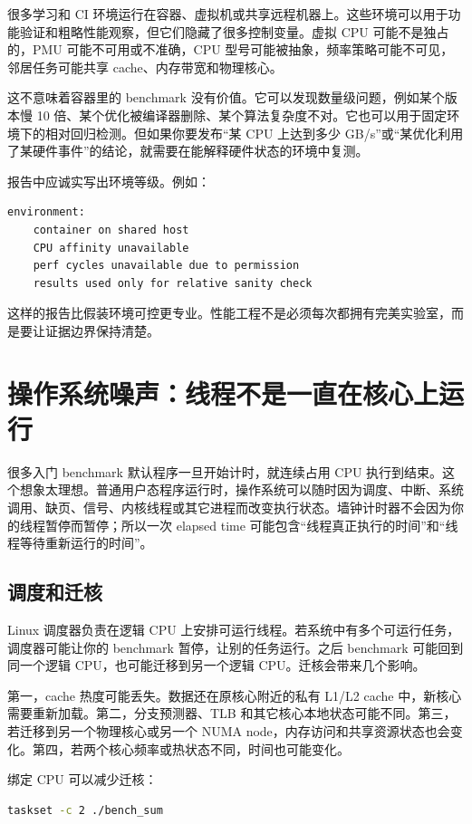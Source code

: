 很多学习和 CI 环境运行在容器、虚拟机或共享远程机器上。这些环境可以用于功能验证和粗略性能观察，但它们隐藏了很多控制变量。虚拟 CPU 可能不是独占的，PMU 可能不可用或不准确，CPU 型号可能被抽象，频率策略可能不可见，邻居任务可能共享 cache、内存带宽和物理核心。

这不意味着容器里的 benchmark 没有价值。它可以发现数量级问题，例如某个版本慢 10 倍、某个优化被编译器删除、某个算法复杂度不对。它也可以用于固定环境下的相对回归检测。但如果你要发布“某 CPU 上达到多少 GB/s”或“某优化利用了某硬件事件”的结论，就需要在能解释硬件状态的环境中复测。

报告中应诚实写出环境等级。例如：

\begin{lstlisting}
environment:
    container on shared host
    CPU affinity unavailable
    perf cycles unavailable due to permission
    results used only for relative sanity check
\end{lstlisting}

这样的报告比假装环境可控更专业。性能工程不是必须每次都拥有完美实验室，而是要让证据边界保持清楚。

\section{操作系统噪声：线程不是一直在核心上运行}

很多入门 benchmark 默认程序一旦开始计时，就连续占用 CPU 执行到结束。这个想象太理想。普通用户态程序运行时，操作系统可以随时因为调度、中断、系统调用、缺页、信号、内核线程或其它进程而改变执行状态。墙钟计时器不会因为你的线程暂停而暂停；所以一次 elapsed time 可能包含“线程真正执行的时间”和“线程等待重新运行的时间”。

\subsection{调度和迁核}

Linux 调度器负责在逻辑 CPU 上安排可运行线程。若系统中有多个可运行任务，调度器可能让你的 benchmark 暂停，让别的任务运行。之后 benchmark 可能回到同一个逻辑 CPU，也可能迁移到另一个逻辑 CPU。迁核会带来几个影响。

第一，cache 热度可能丢失。数据还在原核心附近的私有 L1/L2 cache 中，新核心需要重新加载。第二，分支预测器、TLB 和其它核心本地状态可能不同。第三，若迁移到另一个物理核心或另一个 NUMA node，内存访问和共享资源状态也会变化。第四，若两个核心频率或热状态不同，时间也可能变化。

绑定 CPU 可以减少迁核：

\begin{lstlisting}[language=bash]
taskset -c 2 ./bench_sum
\end{lstlisting}

